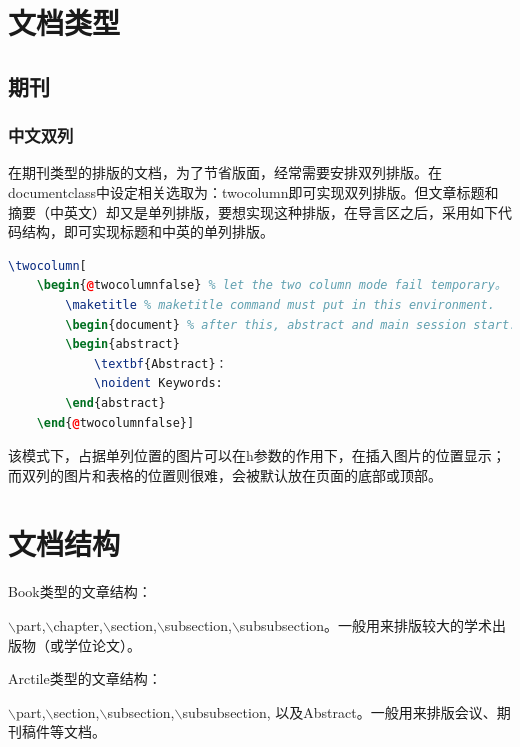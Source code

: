 \documentclass[12pt]{book}
\begin{document}
\section{文档类型}

\subsection{期刊}

\subsubsection{中文双列}
在期刊类型的排版的文档，为了节省版面，经常需要安排双列排版。在documentclass中设定相关选取为：twocolumn即可实现双列排版。但文章标题和摘要（中英文）却又是单列排版，要想实现这种排版，在导言区之后，采用如下代码结构，即可实现标题和中英的单列排版。

\begin{lstlisting}[language=tex,breaklines]
    \twocolumn[
    \begin{@twocolumnfalse} % let the two column mode fail temporary。
        \maketitle % maketitle command must put in this environment.
        \begin{document} % after this, abstract and main session start.
        \begin{abstract}
            \textbf{Abstract}：
            \noident Keywords:
        \end{abstract}
    \end{@twocolumnfalse}]     
\end{lstlisting}
    
该模式下，占据单列位置的图片可以在h参数的作用下，在插入图片的位置显示；而双列的图片和表格的位置则很难，会被默认放在页面的底部或顶部。
    
\section{文档结构}


Book类型的文章结构：

$\backslash$part,$\backslash$chapter,$\backslash$section,$\backslash$subsection,$\backslash$subsubsection。一般用来排版较大的学术出版物（或学位论文）。

Arctile类型的文章结构：

$\backslash$part,$\backslash$section,$\backslash$subsection,$\backslash$subsubsection, 以及Abstract。一般用来排版会议、期刊稿件等文档。
\end{document}
